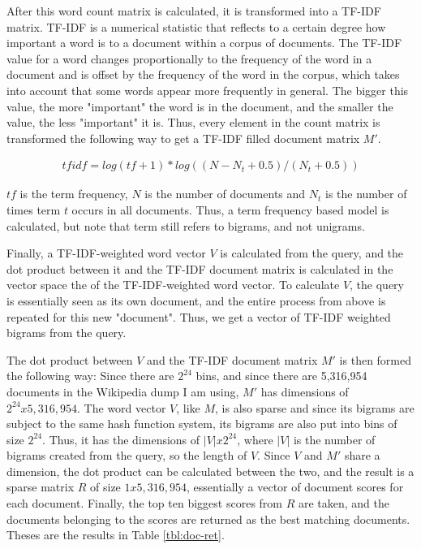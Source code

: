 After this word count matrix is calculated, it is transformed into a TF-IDF matrix. TF-IDF is a numerical statistic that reflects
to a certain degree how important a word is to a document within a corpus of documents. The TF-IDF value for a word changes
proportionally to the frequency of the word in a document and is offset by the frequency of the word in the corpus, which takes
into account that some words appear more frequently in general. The bigger this value, the more "important" the word is in the
document, and the smaller the value, the less "important" it is. Thus, every element in the count matrix is transformed the following
way to get a TF-IDF filled document matrix $M'$.

\begin{gather}
tfidf = log(tf + 1) * log((N - N_t + 0.5) / (N_t + 0.5))
\end{gather}

$tf$ is the term frequency, $N$ is the number of documents and $N_t$ is the number of times term $t$ occurs in all documents. Thus,
a term frequency based model is calculated, but note that term still refers to bigrams, and not unigrams.

Finally, a TF-IDF-weighted word vector $V$ is calculated from the query, and the dot product between it and the TF-IDF document
matrix is calculated in the vector space the of the TF-IDF-weighted word vector. To calculate $V$, the query is essentially seen as
its own document, and the entire process from above is repeated for this new "document". Thus, we get a vector of TF-IDF weighted
bigrams from the query.

The dot product between $V$ and the TF-IDF document matrix $M'$ is then formed the following way: Since there are $2^{24}$ bins,
and since there are 5,316,954 documents in the Wikipedia dump I am using, $M'$ has dimensions of $2^{24} x 5,316,954$. The word
vector $V$, like $M$, is also sparse and since its bigrams are subject to the same hash function system, its bigrams are also put
into bins of size $2^{24}$. Thus, it has the dimensions of $|V| x 2^{24}$, where $|V|$ is the number of bigrams created from the
query, so the length of $V$. Since $V$ and $M'$ share a dimension, the dot product can be calculated between the two, and the
result is a sparse matrix $R$ of size $1 x 5,316,954$, essentially a vector of document scores for each document. Finally, the top
ten biggest scores from $R$ are taken, and the documents belonging to the scores are returned as the best matching documents.
Theses are the results in Table \ref{tbl:doc-ret}.

